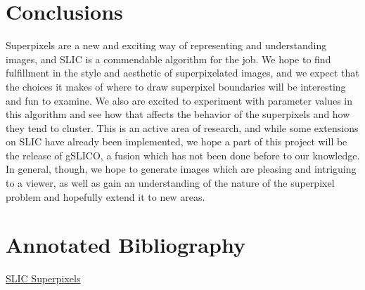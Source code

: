 \documentclass[11pt]{article}
\begin{document}
\section {Conclusions}\label{conclusions}
Superpixels are a new and exciting way of representing and understanding images, and SLIC is a commendable algorithm for the job. We hope to find fulfillment in the style and aesthetic of superpixelated images, and we expect that the choices it makes of where to draw superpixel boundaries will be interesting and fun to examine. We also are excited to experiment with parameter values in this algorithm and see how that affects the behavior of the superpixels and how they tend to cluster. This is an active area of research, and while some extensions on SLIC have already been implemented, we hope a part of this project will be the release of gSLICO, a fusion which has not been done before to our knowledge. In general, though, we hope to generate images which are pleasing and intriguing to a viewer, as well as gain an understanding of the nature of the superpixel problem and hopefully extend it to new areas.





\newpage

\onecolumn
\section*{Annotated Bibliography}\label{annon}

\hyperlink{https://infoscience.epfl.ch/record/149300/files/SLIC_Superpixels_TR_2.pdf}{SLIC Superpixels} \cite{slic}
\end{document}
